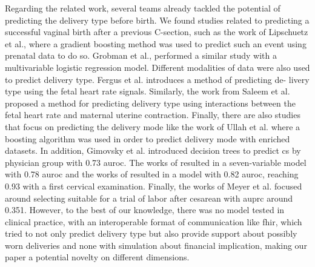 
Regarding the related work, several teams already tackled the potential of predicting the delivery type before birth. We found studies related to predicting a successful vaginal birth after a previous C-section, such as the work of Lipschuetz et al., \cite{lipschuetzPredictionVaginalBirth2020}  where a gradient boosting method was used to predict such an event using prenatal data to do so. Grobman et al., \cite{grobman_development_2007} performed a similar study with a multivariable logistic regression model. Different modalities of data were also used to predict delivery type. Fergus et al. \cite{fergusClassificationCaesareanSection2017} introduces a method of predicting de- livery type using the fetal heart rate signals. Similarly, the work from Saleem et al. \cite{saleemStrategyClassificationVaginal2019a} proposed a method for predicting delivery type using interactions between the fetal heart rate and maternal uterine contraction. Finally, there are also studies that focus on predicting the delivery mode like the work of Ullah et al. \cite{ullah_reliable_2021} where a boosting algorithm was used in order to predict delivery mode with enriched datasets. In addition, Gimovsky et al. \cite{gimovskyBenchmarkingCesareanDelivery} introduced decision trees to predict \ac{cs} by physician group with 0.73 \ac{auroc}. The works of \cite{rossiRiskCalculatorPredict2020b} resulted in a seven-variable model with 0.78 \ac{auroc} and the works of \cite{guedaliaRealtimeDataAnalysis2020} resulted in a model with 0.82 \ac{auroc}, reaching 0.93 with a first cervical examination. Finally, the works of Meyer et al. \cite{meyerImplementationMachineLearning2020} focused around selecting suitable for a trial of labor after cesarean with \ac{auprc} around 0.351. However, to the best of our knowledge, there was no model tested in clinical practice, with an interoperable format of communication like \ac{fhir}, which tried to not only predict delivery type but also provide support about possibly worn deliveries and none with simulation about financial implication, making our paper a potential novelty on different dimensions.